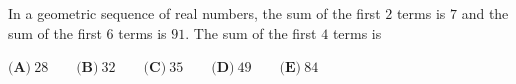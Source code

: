 In a geometric sequence of real numbers, the sum of the first $2$ terms is $7$ and the sum of the first $6$ terms is $91$. The sum of the first $4$ terms is

$\textbf{(A)}\ 28\qquad\textbf{(B)}\ 32\qquad\textbf{(C)}\ 35\qquad\textbf{(D)}\ 49\qquad\textbf{(E)}\ 84$
